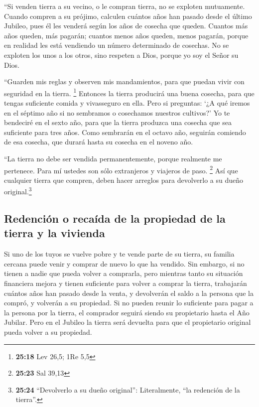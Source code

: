  ``Si venden tierra a su vecino, o le compran tierra, no
se exploten mutuamente.  Cuando compren a su prójimo,
calculen cuántos años han pasado desde el último Jubileo, pues él les
venderá según los años de cosecha que queden.  Cuantos
más años queden, más pagarán; cuantos menos años queden, menos pagarán,
porque en realidad les está vendiendo un número determinado de cosechas.
 No se exploten los unos a los otros, sino respeten a
Dios, porque yo soy el Señor su Dios.

 ``Guarden mis reglas y observen mis mandamientos, para
que puedan vivir con seguridad en la tierra. \footnote{\textbf{25:18}
  Lev 26,5; 1Re 5,5}  Entonces la tierra producirá una
buena cosecha, para que tengas suficiente comida y vivasseguro en ella.
 Pero si preguntas: `¿A qué iremos en el séptimo año si
no sembramos o cosechamos nuestros cultivos?'  Yo te
bendeciré en el sexto año, para que la tierra produzca una cosecha que
sea suficiente para tres años.  Como sembrarán en el
octavo año, seguirán comiendo de esa cosecha, que durará hasta su
cosecha en el noveno año.

 ``La tierra no debe ser vendida permanentemente, porque
realmente me pertenece. Para mí ustedes son sólo extranjeros y viajeros
de paso. \footnote{\textbf{25:23} Sal 39,13}  Así que
cualquier tierra que compren, deben hacer arreglos para devolverlo a su
dueño original.\footnote{\textbf{25:24} ``Devolverlo a su dueño
  original'': Literalmente, ``la redención de la tierra''.}

\hypertarget{redenciuxf3n-o-recauxedda-de-la-propiedad-de-la-tierra-y-la-vivienda}{%
\subsection{Redención o recaída de la propiedad de la tierra y la
vivienda}\label{redenciuxf3n-o-recauxedda-de-la-propiedad-de-la-tierra-y-la-vivienda}}

 Si uno de los tuyos se vuelve pobre y te vende parte de
su tierra, su familia cercana puede venir y comprar de nuevo lo que ha
vendido.  Sin embargo, si no tienen a nadie que pueda
volver a comprarla, pero mientras tanto su situación financiera mejora y
tienen suficiente para volver a comprar la tierra, 
trabajarán cuántos años han pasado desde la venta, y devolverán el saldo
a la persona que la compró, y volverán a su propiedad. 
Si no pueden reunir lo suficiente para pagar a la persona por la tierra,
el comprador seguirá siendo su propietario hasta el Año Jubilar. Pero en
el Jubileo la tierra será devuelta para que el propietario original
pueda volver a su propiedad.

